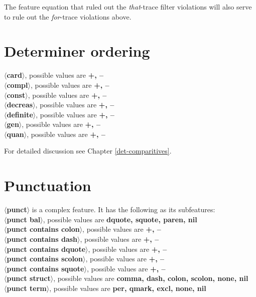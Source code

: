 \beginsentences
{}\label{ex:247} 
\label{ex:248} 
\endsentences

 
The feature equation that ruled out the {\em that}-trace filter violations 
will also serve to rule out the {\em for}-trace violations above. 
 
\section{Determiner ordering} 
{\bf $\langle$card$\rangle$}, possible values are {\bf +, --}\\ 
{\bf $\langle$compl$\rangle$}, possible values are {\bf +, --}\\ 
{\bf $\langle$const$\rangle$}, possible values are {\bf +, --}\\ 
{\bf $\langle$decreas$\rangle$}, possible values are {\bf +, --}\\ 
{\bf $\langle$definite$\rangle$}, possible values are {\bf +, --}\\ 
{\bf $\langle$gen$\rangle$}, possible values are {\bf +, --}\\ 
{\bf $\langle$quan$\rangle$}, possible values are {\bf +, --} 
 
For detailed discussion see Chapter \ref{det-comparitives}. 
 
\section{Punctuation} 
{\bf $\langle$punct$\rangle$} is a complex feature. It has the following 
as its subfeatures:\\ 
{\bf $\langle$punct bal$\rangle$}, possible values are {\bf dquote, squote, paren, nil}\\ 
{\bf $\langle$punct contains colon$\rangle$}, possible values are {\bf +, --}\\ 
{\bf $\langle$punct contains dash$\rangle$}, possible values are {\bf +, --}\\ 
{\bf $\langle$punct contains dquote$\rangle$}, possible values are {\bf +, --}\\ 
{\bf $\langle$punct contains scolon$\rangle$}, possible values are {\bf +, --}\\ 
{\bf $\langle$punct contains squote$\rangle$}, possible values are {\bf +, --}\\ 
{\bf $\langle$punct struct$\rangle$}, possible values are {\bf comma, dash, colon, scolon, none, nil}\\ 
{\bf $\langle$punct term$\rangle$}, possible values are {\bf per, qmark, excl, none, nil} 
 
